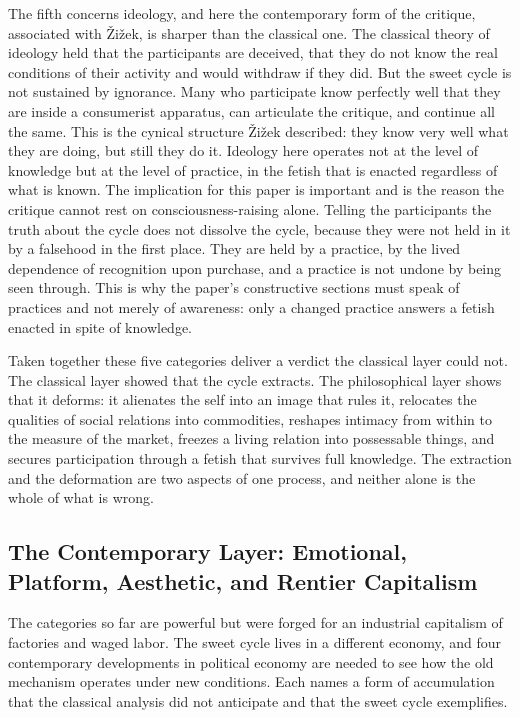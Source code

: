 \documentclass[11pt,a4paper]{article}
\begin{document}
The fifth concerns ideology, and here the contemporary form of the critique, associated with Žižek, is sharper than the classical one. The classical theory of ideology held that the participants are deceived, that they do not know the real conditions of their activity and would withdraw if they did. But the sweet cycle is not sustained by ignorance. Many who participate know perfectly well that they are inside a consumerist apparatus, can articulate the critique, and continue all the same. This is the cynical structure Žižek described: they know very well what they are doing, but still they do it. Ideology here operates not at the level of knowledge but at the level of practice, in the fetish that is enacted regardless of what is known. The implication for this paper is important and is the reason the critique cannot rest on consciousness-raising alone. Telling the participants the truth about the cycle does not dissolve the cycle, because they were not held in it by a falsehood in the first place. They are held by a practice, by the lived dependence of recognition upon purchase, and a practice is not undone by being seen through. This is why the paper's constructive sections must speak of practices and not merely of awareness: only a changed practice answers a fetish enacted in spite of knowledge.

Taken together these five categories deliver a verdict the classical layer could not. The classical layer showed that the cycle extracts. The philosophical layer shows that it deforms: it alienates the self into an image that rules it, relocates the qualities of social relations into commodities, reshapes intimacy from within to the measure of the market, freezes a living relation into possessable things, and secures participation through a fetish that survives full knowledge. The extraction and the deformation are two aspects of one process, and neither alone is the whole of what is wrong.

\subsection{The Contemporary Layer: Emotional, Platform, Aesthetic, and Rentier Capitalism}

The categories so far are powerful but were forged for an industrial capitalism of factories and waged labor. The sweet cycle lives in a different economy, and four contemporary developments in political economy are needed to see how the old mechanism operates under new conditions. Each names a form of accumulation that the classical analysis did not anticipate and that the sweet cycle exemplifies.
\end{document}

